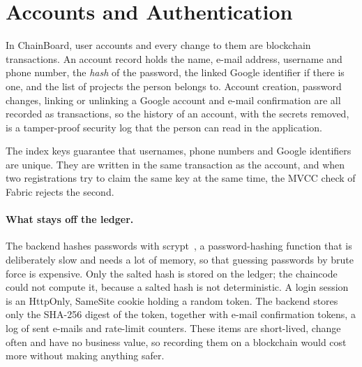 \section{Accounts and Authentication}
\label{sec:authentication}

In ChainBoard, user accounts and every change to them are blockchain transactions. An account record holds the name, e-mail address, username and phone number, the \emph{hash} of the password, the linked Google identifier if there is one, and the list of projects the person belongs to. Account creation, password changes, linking or unlinking a Google account and e-mail confirmation are all recorded as transactions, so the history of an account, with the secrets removed, is a tamper-proof security log that the person can read in the application.

The index keys guarantee that usernames, phone numbers and Google identifiers are unique. They are written in the same transaction as the account, and when two registrations try to claim the same key at the same time, the MVCC check of Fabric rejects the second.

\paragraph*{What stays off the ledger.} The backend hashes passwords with scrypt~\cite{percival2009scrypt,rfc7914}, a password-hashing function that is deliberately slow and needs a lot of memory, so that guessing passwords by brute force is expensive. Only the salted hash is stored on the ledger; the chaincode could not compute it, because a salted hash is not deterministic. A login session is an HttpOnly, SameSite cookie holding a random token. The backend stores only the SHA-256 digest of the token, together with e-mail confirmation tokens, a log of sent e-mails and rate-limit counters. These items are short-lived, change often and have no business value, so recording them on a blockchain would cost more without making anything safer.

